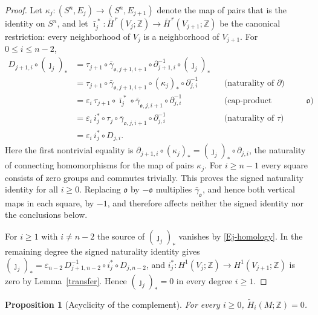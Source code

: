 \documentclass[12pt,oneside,a4paper]{article}
\newtheorem{proposition}[definition]{Proposition}
\theoremstyle{mytheorem}
\theoremstyle{remark}
\theoremstyle{definition}
\begin{document}
\begin{proof}
Let $\kappa_j:(S^n,E_j)\to(S^n,E_{j+1})$ denote the map
of pairs that is the identity on $S^n$, and let
$\bar\imath_j^{\;*}:\bar H^{\,r}(V_j;\mathbb Z)\to
\bar H^{\,r}(V_{j+1};\mathbb Z)$ be the canonical restriction: every
neighborhood of $V_j$ is a neighborhood of $V_{j+1}$.  For
$0\leq i\leq n-2$,
\begin{align*}
D_{j+1,i}\circ(\jmath_j)_*
&=\tau_{j+1}\circ\bar\gamma_{\mathfrak o,j+1,i+1}\circ\partial_{j+1,i}^{-1}
  \circ(\jmath_j)_*\\
&=\tau_{j+1}\circ\bar\gamma_{\mathfrak o,j+1,i+1}\circ(\kappa_j)_*
  \circ\partial_{j,i}^{-1}
  &&\text{(naturality of $\partial$)}\\
&=\varepsilon_i\,\tau_{j+1}\circ\bar\imath_j^{\;*}\circ\bar\gamma_{\mathfrak o,j,i+1}
  \circ\partial_{j,i}^{-1}
  &&\text{(cap-product naturality, same $\mathfrak o$)}\\
&=\varepsilon_i\,i_j^*\circ\tau_j\circ\bar\gamma_{\mathfrak o,j,i+1}\circ\partial_{j,i}^{-1}
  &&\text{(naturality of $\tau$)}\\
&=\varepsilon_i\,i_j^*\circ D_{j,i}.
\end{align*}
Here the first nontrivial equality is
$\partial_{j+1,i}\circ(\kappa_j)_*=(\jmath_j)_*\circ\partial_{j,i}$,
the naturality of connecting homomorphisms for the map of pairs
$\kappa_j$.  For $i\geq n-1$ every square consists of zero groups and
commutes trivially.  This proves the signed naturality identity for all
$i\geq0$.  Replacing $\mathfrak o$ by $-\mathfrak o$ multiplies
$\bar\gamma_{\mathfrak o}$, and hence both
vertical maps in each square, by $-1$, and therefore affects neither the
signed identity nor the conclusions below.


For $i\geq1$ with $i\neq n-2$ the source of $(\jmath_j)_*$ vanishes by
\eqref{Ej-homology}.  In the remaining degree the signed naturality
identity gives
\((\jmath_j)_*
=\varepsilon_{n-2}\,D_{j+1,n-2}^{-1}\circ i_j^*\circ D_{j,n-2}\),
and $i_j^*:H^1(V_j;\mathbb Z)\to H^1(V_{j+1};\mathbb Z)$ is zero by
Lemma~\ref{transfer}.  Hence $(\jmath_j)_*=0$ in every degree
$i\geq1$.
\end{proof}

\begin{proposition}[Acyclicity of the complement]\label{prop:acyclic}
For every $i\geq0$, $\widetilde H_i(M;\mathbb Z)=0$.
\end{proposition}
\end{document}
